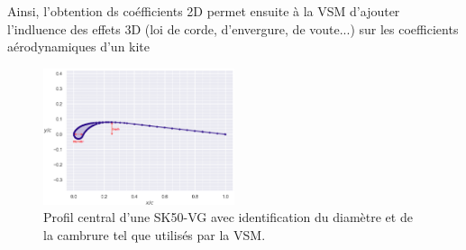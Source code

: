 Ainsi, l'obtention ds coéfficients 2D permet ensuite à la VSM d'ajouter l'indluence des effets 3D (loi de corde, d'envergure, de voute...) sur les coefficients aérodynamiques d'un kite

\begin{figure}[H]
    \centering
    \includegraphics[width=0.5\textwidth]{Pics/airfoil.png}  
    \caption{Profil central d'une SK50-VG avec identification du diamètre et de la cambrure tel que utilisés par la VSM.}
    \label{fig:airfoil}
\end{figure}